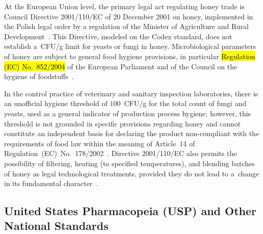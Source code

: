 \documentclass[foods,review,accept,pdftex,moreauthors]{Definitions/mdpi}
\begin{document}
At the European Union level, the primary legal act regulating honey
trade is Council Directive 2001/110/EC of 20 December 2001 on honey,
implemented in the Polish legal order by a regulation of the Minister
of Agriculture and Rural Development~\cite{eudir2001110}.
This Directive, modeled on the Codex standard, does not establish
a~CFU/g limit for yeasts or fungi in honey. Microbiological parameters
of honey are subject to general food hygiene provisions, in particular
\hl{Regulation (EC) No.~852/2004} %
  of the European Parliament and of the
Council on the hygiene of foodstuffs~\cite{eudir2001110}.

In the control practice of veterinary and sanitary inspection
laboratories, there is an unofficial hygiene threshold of
$100$~CFU/g for the total count of fungi and yeasts, used as a general
indicator of production process hygiene; however, this threshold is
not grounded in specific provisions regarding honey and cannot
constitute an independent basis for declaring the product
non-compliant with the requirements of food law within the meaning
of Article~14 of Regulation~(EC)~No.~178/2002~\cite{eudir2001110}.
Directive 2001/110/EC also permits the possibility of filtering,
heating (to specified temperatures), and blending batches of honey
as legal technological treatments, provided they do not lead to
a~change in its fundamental character~\cite{eudir2001110}.


\subsection{United States Pharmacopeia (USP) and Other National Standards}
\end{document}
